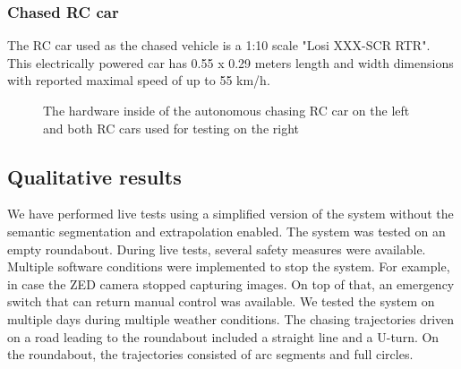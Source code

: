 \documentclass{ctuthesis/ctuthesis}
\begin{document}
\subsubsection{Chased RC car}
The RC car used as the chased vehicle is a 1:10 scale "Losi XXX-SCR RTR". This electrically powered car has 0.55 x 0.29 meters length and width dimensions with reported maximal speed of up to 55 km/h.

\begin{figure}[]
    \centering
    \qquad
    \caption{The hardware inside of the autonomous chasing RC car on the left and both RC cars used for testing on the right}%
    \label{fig:rc_cars}%
\end{figure}



\subsection{Qualitative results}
We have performed live tests using a simplified version of the system without the semantic segmentation and extrapolation enabled. The system was tested on an empty roundabout. During live tests, several safety measures were available. Multiple software conditions were implemented to stop the system. For example, in case the ZED camera stopped capturing images. On top of that, an emergency switch that can return manual control was available. We tested the system on multiple days during multiple weather conditions. The chasing trajectories driven on a road leading to the roundabout included a straight line and a U-turn. On the roundabout, the trajectories consisted of arc segments and full circles. \par
\end{document}
